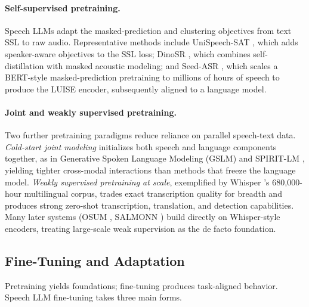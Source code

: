 \paragraph{Self-supervised pretraining.}
Speech LLMs adapt the masked-prediction and clustering objectives from
text SSL to raw audio. Representative methods include UniSpeech-SAT
\citep{chen2022unispeech}, which adds speaker-aware objectives to the SSL
loss; DinoSR \citep{liu2023dinosr}, which combines self-distillation with
masked acoustic modeling; and Seed-ASR \citep{bai2024seed}, which scales a
BERT-style masked-prediction pretraining to millions of hours of speech
to produce the LUISE encoder, subsequently aligned to a language model.

\paragraph{Joint and weakly supervised pretraining.}
Two further pretraining paradigms reduce reliance on parallel speech-text
data. \emph{Cold-start joint modeling} initializes both speech and
language components together, as in Generative Spoken Language Modeling
(GSLM) \citep{lakhotia2021generative} and SPIRIT-LM \citep{nguyen2025spirit},
yielding tighter cross-modal interactions than methods that freeze the
language model. \emph{Weakly supervised pretraining at scale}, exemplified
by Whisper \citep{radford2023robust}'s 680{,}000-hour multilingual corpus,
trades exact transcription quality for breadth and produces strong
zero-shot transcription, translation, and detection capabilities. Many
later systems (OSUM \citep{geng2025osum}, SALMONN \citep{tang2023salmonn})
build directly on Whisper-style encoders, treating large-scale weak
supervision as the de facto foundation.

\subsection{Fine-Tuning and Adaptation}
\label{subsec:training_finetuning}

Pretraining yields foundations; fine-tuning produces task-aligned
behavior. Speech LLM fine-tuning takes three main forms.

